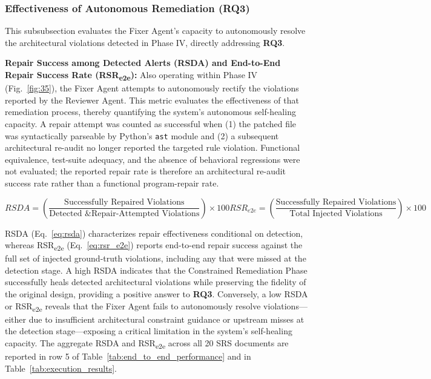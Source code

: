 \subsubsection{Effectiveness of Autonomous Remediation (RQ3)}

This subsubsection evaluates the Fixer Agent's capacity to autonomously resolve the architectural violations detected in Phase IV, directly addressing \textbf{RQ3}.

\textbf{Repair Success among Detected Alerts (RSDA) and End-to-End Repair Success Rate (RSR\textsubscript{e2e}):} Also operating within Phase IV (Fig.~\ref{fig:35}), the Fixer Agent attempts to autonomously rectify the violations reported by the Reviewer Agent. This metric evaluates the effectiveness of that remediation process, thereby quantifying the system's autonomous self-healing capacity. A repair attempt was counted as successful when (1) the patched file was syntactically parseable by Python's \texttt{ast} module and (2) a subsequent architectural re-audit no longer reported the targeted rule violation. Functional equivalence, test-suite adequacy, and the absence of behavioral regressions were not evaluated; the reported repair rate is therefore an architectural re-audit success rate rather than a functional program-repair rate.

\begin{subequations}
\begin{equation} \label{eq:rsda}
RSDA = \left( \frac{\text{Successfully Repaired Violations}}{\text{Detected \& Repair-Attempted Violations}} \right) \times 100
\end{equation}

\begin{equation} \label{eq:rsr_e2e}
RSR_{e2e} = \left( \frac{\text{Successfully Repaired Violations}}{\text{Total Injected Violations}} \right) \times 100
\end{equation}
\end{subequations}

RSDA (Eq.~\ref{eq:rsda}) characterizes repair effectiveness conditional on detection, whereas RSR\textsubscript{e2e} (Eq.~\ref{eq:rsr_e2e}) reports end-to-end repair success against the full set of injected ground-truth violations, including any that were missed at the detection stage. A high RSDA indicates that the Constrained Remediation Phase successfully heals detected architectural violations while preserving the fidelity of the original design, providing a positive answer to \textbf{RQ3}. Conversely, a low RSDA or RSR\textsubscript{e2e} reveals that the Fixer Agent fails to autonomously resolve violations---either due to insufficient architectural constraint guidance or upstream misses at the detection stage---exposing a critical limitation in the system's self-healing capacity. The aggregate RSDA and RSR\textsubscript{e2e} across all 20 SRS documents are reported in row 5 of Table~\ref{tab:end_to_end_performance} and in Table~\ref{tab:execution_results}.


